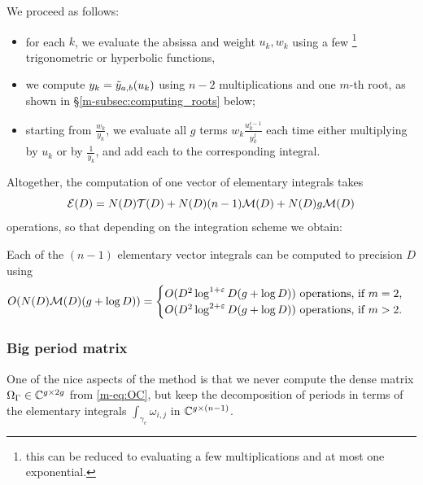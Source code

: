 \documentclass[main.tex]{subfiles}
\begin{document}
   We proceed as follows:
   \begin{itemize}
   \item for each $k$, we evaluate the absissa and weight $u_k,w_k$ using
       a few \footnote{this can be reduced to evaluating
           a few multiplications and at most one exponential.} trigonometric or hyperbolic functions,
   \item we compute $y_k=\tilde{y}_{a,b}(u_k)$ using $n-2$ multiplications and one $m$-th root,
       as shown in \S \ref{m-subsec:computing_roots} below;
   \item starting from $\frac{w_k}{y_k}$, we evaluate all $g$ terms $w_k\frac{u_k^{i-1}}{y_k^j}$
       each time either multiplying by $u_k$ or by $\frac{1}{y_k}$, and add each to the corresponding
       integral.
   \end{itemize}

   Altogether, the computation of one vector of elementary integrals takes
   \begin{equation}\label{eq:elem_int_complexity}
    \mathcal E(D) = N(D)\mathcal T(D)+N(D)(n-1)\mathcal M(D)+N(D)g\mathcal M(D)
   \end{equation}
    operations,
   so that depending on the integration scheme we obtain:
   \begin{thm}\label{thm:complexity_integrals}
       Each of the $(n-1)$ elementary vector integrals can be computed to precision $D$ using
       \begin{equation*}
           O(N(D)\mathcal M(D)(g+\log D)) =
           \begin{cases}
               O(D^2\log^{1+\varepsilon} D (g + \log D)) \text{ operations, if $m=2$,}\\
               O(D^2\log^{2+\varepsilon} D (g + \log D)) \text{ operations, if $m>2$.}
           \end{cases}
       \end{equation*}
   \end{thm}

   \subsubsection{Big period matrix}

   One of the nice aspects of the method is that we never compute
   the dense matrix $\Omega_{\Gamma}\in\mathbb{C}^{g\times 2g}$ from \eqref{m-eq:OC}, but
   keep the decomposition of periods in terms of the elementary integrals
   $\int_{\gamma_e}\omega_{i,j}$ in $\mathbb{C}^{g\times (n-1)}$.
\end{document}

